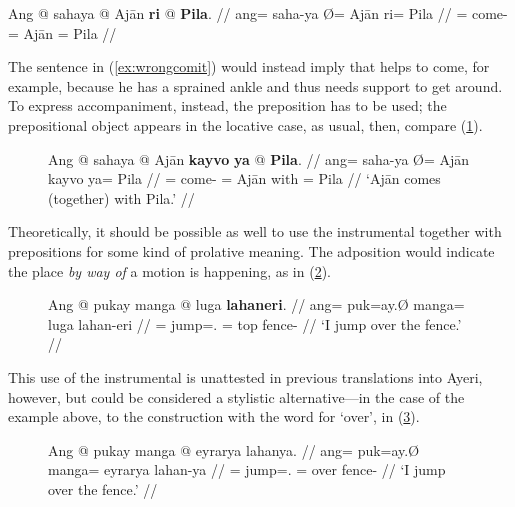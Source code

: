 \ex\label{ex:wrongcomit}\ljudge* \begingl
	\gla Ang @ sahaya {} @ Ajān \textbf{ri} @ \textbf{Pila}. //
	\glb ang= saha-ya Ø= Ajān ri= Pila //
	\glc \AgtT{}= come-\TsgM{} \Top{}= Ajān \Ins{}= Pila //
\endgl\xe

The sentence in (\ref{ex:wrongcomit}) would instead imply that  helps 
to come, for example, because he has a sprained ankle and thus needs support to
get around. To express accompaniment, instead, the preposition
 has to be used; the prepositional
object appears in the locative case, as usual, then, compare
(\ref{ex:comitwith}).

\begin{figure}[h]
\ex\label{ex:comitwith}%
\begingl
	\gla Ang @ sahaya {} @ Ajān \textbf{kayvo} \textbf{ya} @ \textbf{Pila}. //
	\glb ang= saha-ya Ø= Ajān kayvo ya= Pila //
	\glc \AgtT{}= come-\TsgM{} \Top{}= Ajān with \Loc{}= Pila //
	\glft `Ajān comes (together) with Pila.' //
\endgl\xe
\end{figure}

Theoretically, it should be possible as well to use the instrumental together
with prepositions for some kind of prolative meaning. The adposition would
indicate the place \emph{by way of} a motion is happening, as in
(\ref{ex:viains}).

\begin{figure}[h]
\ex\label{ex:viains}
\begingl
	\gla Ang @ pukay manga @ luga \textbf{lahaneri}. //
	\glb ang= puk=ay.Ø manga= luga lahan-eri //
	\glc \AgtT{}= jump=\Fsg{}.\Top{} \Dir{}= top fence-\Ins{} //
	\glft `I jump over the fence.' //
\endgl\xe
\end{figure}

This use of the instrumental is unattested in previous translations into Ayeri,
however, but could be considered a stylistic alternative---in the case of the
example above, to the construction with the word for `over',
 in (\ref{ex:vialoc}).

\begin{figure}[h]
\ex\label{ex:vialoc}
\begingl
	\gla Ang @ pukay manga @ eyrarya lahanya. //
	\glb ang= puk=ay.Ø manga= eyrarya lahan-ya //
	\glc \AgtT{}= jump=\Fsg{}.\Top{} \Dir{}= over fence-\Loc{} //
	\glft `I jump over the fence.' //
\endgl\xe
\end{figure}

